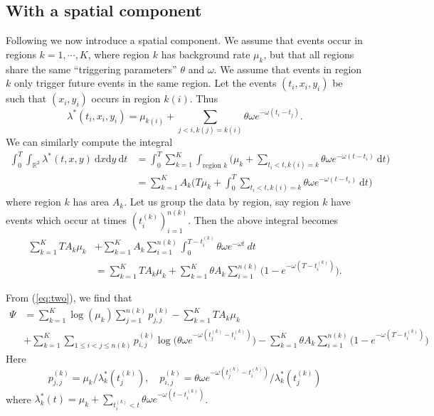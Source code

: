\documentclass[twoside,a4paper]{article}
\theoremstyle{plain}
\theoremstyle{definition}
\newcommand{\rd}{\textrm{d}}
\begin{document}
\subsection{With a spatial component}\label{app:grid_model_em}

Following \cite[Section~2.2]{sepp2} we now introduce a spatial component.
We assume that events occur in regions $k=1,\cdots,K$, where region $k$ has background rate
$\mu_k$, but that all regions share the same ``triggering parameters'' $\theta$ and $\omega$.
We assume that events in region $k$ only trigger future events in the same region.
Let the events $(t_i, x_i, y_i)$ be such that $(x_i,y_i)$ occurs in region $k(i)$.  Thus
\[ \lambda^*(t_i,x_i,y_i) = \mu_{k(i)} + \sum_{j<i, k(j)=k(i)} \theta \omega e^{-\omega(t_i-t_j)}. \]
We can similarly compute the integral
\begin{align*}
\int_0^T \int_{\mathbb R^2} \lambda^*(t,x,y) \ \rd x \rd y \ \rd t
&= \int_0^T \sum_{k=1}^K \int_{\text{region }k} \Big( \mu_k + \sum_{t_i < t, k(i)=k}
   \theta \omega e^{-\omega(t-t_i)} \ \rd t \Big) \\
&= \sum_{k=1}^K A_k \Big( T\mu_k + \int_0^T \sum_{t_i < t, k(i)=k}
   \theta \omega e^{-\omega(t-t_i)} \ \rd t \Big)
\end{align*}
where region $k$ has area $A_k$.  Let us group the data by region, say
region $k$ have events which occur at times $(t^{(k)}_i)_{i=1}^{n(k)}$.  Then the
above integral becomes
\begin{align*} \sum_{k=1}^K TA_k\mu_k &+ \sum_{k=1}^K A_k \sum_{i=1}^{n(k)}
\int_0^{T-t^{(k)}_i} \theta\omega e^{-\omega t} \ dt \\
&= \sum_{k=1}^K TA_k\mu_k + \sum_{k=1}^K \theta A_k \sum_{i=1}^{n(k)}
\big( 1 - e^{-\omega (T-t^{(k)}_i)} \big).
\end{align*}

From (\ref{eq:two}), we find that
\begin{align*} \Psi &=
\sum_{k=1}^K \log(\mu_k) \sum_{j=1}^{n(k)} p^{(k)}_{j,j} - \sum_{k=1}^K TA_k\mu_k\\
&+ \sum_{k=1}^K \sum_{1\leq i<j\leq n(k)} p^{(k)}_{i,j} \log\big( \theta\omega
  e^{-\omega(t^{(k)}_j - t^{(k)}_i)} \big) - \sum_{k=1}^K \theta A_k \sum_{i=1}^{n(k)}
\big( 1 - e^{-\omega (T-t^{(k)}_i)} \big)
\end{align*}
Here
\[ p^{(k)}_{j,j} = \mu_k / \lambda^*_k(t^{(k)}_j), \quad
p^{(k)}_{i,j} = \theta\omega e^{-\omega(t^{(k)}_j - t^{(k)}_i)} / \lambda^*_k(t^{(k)}_j)
\]
where $\lambda^*_k(t) = \mu_k + \sum_{t^{(k)}_i<t} \theta\omega e^{-\omega(t-t^{(k)}_i)}$.
\end{document}
